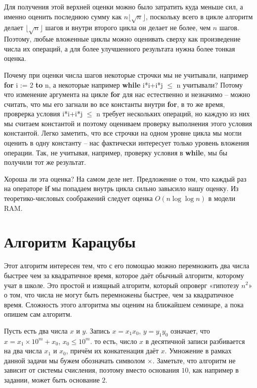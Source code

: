\documentclass[12pt, leqno]{article}
\theoremstyle{definiton}
\theoremstyle{definition}
\theoremstyle{definition}
\let\leq\leqslant
\begin{document}
Для получения этой верхней оценки можно было затратить куда меньше сил, а именно оценить последнюю сумму как $n\lfloor\sqrt{n}\rfloor$, поскольку всего в цикле алгоритм делает $\lfloor\sqrt{n}\rfloor$ шагов и внутри второго цикла он делает не более, чем $n$ шагов. Поэтому, любые вложенные циклы можно оценивать сверху как произведение числа их операций, а для более улучшенного результата нужна более тонкая оценка.

Почему при оценки числа шагов некоторые строчки мы не учитывали, например \textbf{for} i := 2 \textbf{to} n, а некоторые например \textbf{while} i*i+i*j $\leq$ n  учитывали? Потому что изменение аргумента на цикле \textbf{for} для нас естественно и незначимо -- можно считать, что мы его загнали во все константы внутри \textbf{for}, в то же время, проврерка условия i*i+i*j $\leq$ n  требует нескольких операций, но каждую из них мы считаем константой и поэтому оцениваем проверку выполнения этого условия константой. Легко заметить, что все строчки на одном уровне цикла мы могли оценить в одну константу -- нас фактически интересует только уровень вложения операции. Так, не учитывая, например, проверку условия в \textbf{while}, мы бы получили тот же результат.

Хороша ли эта оценка? На самом деле нет. Предложение о том, что каждый раз на операторе \textbf{if} мы попадаем внутрь цикла сильно завысило нашу оценку. Из теоретико-числовых соображений следует оценка $O(n\log\log{n})$ в модели RAM.

\section{Алгоритм Карацубы}

Этот алгоритм интересен тем, что с его помощью можно перемножить два числа быстрее чем за квадратичное время, которое даёт обычный алгоритм, которому учат в школе. Это простой и изящный алгоритм, который опроверг «гипотезу $n^2$» о том, что числа не могут быть перемножены быстрее, чем за квадратичное время. Сложность этого алгоритма мы оценим на ближайшем семинаре, а пока опишем сам алгоритм.

Пусть есть два числа $x$ и $y$. Запись $x = x_1x_0$, $y = y_1y_0$ означает, что $x = x_1\times10^m + x_0$, $x_0 \leq 10^m$. то есть, число $x$ в десятичной записи разбивается на два числа $x_1$ и $x_0$, причём их конкатенация даёт $x$. Умножение в рамках данной задачи мы бужем обозначать символом $\times$. Заметьте, что алгоритм не зависит от системы счисления, поэтому вместо основания $10$, как например в задании, может быть основание $2$.
\end{document}
